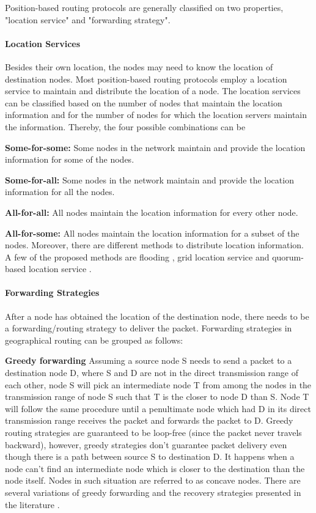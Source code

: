 Position-based routing protocols are generally classified on two properties, "location service" and "forwarding strategy".

\paragraph{Location Services}
Besides their own location, the nodes may need to know the location of destination nodes. Most position-based routing protocols employ a location service to maintain and distribute the location of a node. The location services can be classified based on the number of nodes that maintain the location information and for the number of nodes for which the location servers maintain the information. Thereby, the four possible combinations can be \cite{967595}

\textbf{Some-for-some:} Some nodes in the network maintain and provide the location information for some of the nodes.

\textbf{Some-for-all:} Some nodes in the network maintain and provide the location information for all the nodes.

\textbf{All-for-all:} All nodes maintain the location information for every other node.

\textbf{All-for-some:} All nodes maintain the location information for a subset of the nodes. 
Moreover, there are different methods to distribute location information. A few of the proposed methods are flooding \cite{Basagni:1998:DRE:288235.288254}, grid location service \cite{Li:2000:SLS:345910.345931} and quorum-based location service \cite{769770}.

\paragraph{Forwarding Strategies}
After a node has obtained the location of the destination node, there needs to be a forwarding/routing strategy to deliver the packet. Forwarding strategies in geographical routing can be grouped as follows:

\textbf{Greedy forwarding} Assuming a source node S needs to send a packet to a destination node D, where S and D are not in the direct transmission range of each other, node S will pick an intermediate node T from among the nodes in the transmission range of node S such that T is the closer to node D than S. Node T will follow the same procedure until a penultimate node which had D in its direct transmission range receives the packet and forwards the packet to D. 
Greedy routing strategies are guaranteed to be loop-free (since the packet never travels backward), however, greedy strategies don't guarantee packet delivery even though there is a path between source S to destination D. It happens when a node can't find an intermediate node which is closer to the destination than the node itself. Nodes in such situation are referred to as concave nodes. There are several variations of greedy forwarding and the recovery strategies presented in the literature \cite{OUBBATI201729} \cite{6238283} \cite{967595} \cite{Stojmenovic:2002:PRA:2288474.2290160}.

